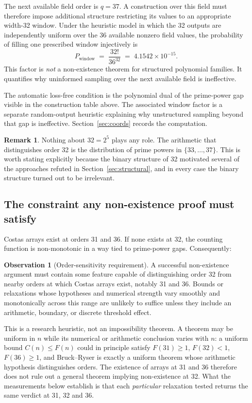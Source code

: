 \documentclass[11pt,a4paper]{article}
\theoremstyle{definition}
\newtheorem{remark}[theorem]{Remark}
\newtheorem{observation}[theorem]{Observation}
\begin{document}
The next available field order is $q=37$. A construction over this field must
therefore impose additional structure restricting its values to an appropriate
width-32 window. Under the heuristic model in which the 32 outputs are
independently uniform over the 36 available nonzero field values, the probability
of filling one prescribed window injectively is
\[
P_{\mathrm{window}} \;=\; \frac{32!}{36^{32}} \;=\; 4.1542\times10^{-15}.
\]
This factor is \emph{not} a non-existence theorem for structured polynomial
families. It quantifies why uninformed sampling over the next available field is
ineffective.

The automatic loss-free condition is the polynomial dual of the prime-power gap
visible in the construction table above. The associated window factor is a
separate random-output heuristic explaining why unstructured sampling beyond that
gap is ineffective. Section~\ref{sec:coords} records the computation.

\begin{remark}
Nothing about $32 = 2^5$ plays any role. The arithmetic that distinguishes order
32 is the distribution of prime powers in $\{33,\dots,37\}$. This is worth
stating explicitly because the binary structure of 32 motivated several of the
approaches refuted in Section~\ref{sec:structural}, and in every case the
binary structure turned out to be irrelevant.
\end{remark}

\subsection{The constraint any non-existence proof must satisfy}

Costas arrays exist at orders 31 and 36. If none exists at 32, the counting
function is non-monotonic in a way tied to prime-power gaps. Consequently:

\begin{observation}[Order-sensitivity requirement]
\label{obs:uniformity}
A successful non-existence argument must contain some feature capable of
distinguishing order 32 from nearby orders at which Costas arrays exist, notably
31 and 36. Bounds or relaxations whose hypotheses and numerical strength vary
smoothly and monotonically across this range are unlikely to suffice unless they
include an arithmetic, boundary, or discrete threshold effect.
\end{observation}

This is a research heuristic, not an impossibility theorem. A theorem may be
uniform in $n$ while its numerical or arithmetic conclusion varies with $n$: a
uniform bound $C(n)\le F(n)$ could in principle satisfy $F(31)\ge1$, $F(32)<1$,
$F(36)\ge1$, and Bruck--Ryser is exactly a uniform theorem whose arithmetic
hypothesis distinguishes orders. The existence of arrays at 31 and 36 therefore
does not rule out a general theorem implying non-existence at 32. What the
measurements below establish is that each \emph{particular} relaxation tested
returns the same verdict at 31, 32 and 36.
\end{document}
